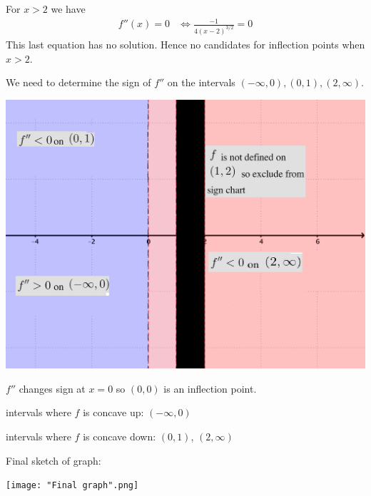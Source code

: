 \documentclass[nooutcomes]{ximera}
\begin{document}
\begin{problem}
\begin{enumerate}
\begin{freeResponse}
        For $x > 2$ we have
        \begin{align*}
          f''(x) = 0 &\iff \frac{-1}{4(x-2)^{3/2}} = 0
        \end{align*}
        This last equation has no solution.
        Hence no candidates for inflection points when $x >2$.

        We need to determine the sign of $f''$ on the intervals $(-\infty,0), (0,1), (2,\infty)$.
        \begin{image}
          \includegraphics[scale = 0.3]{figure11.png}
        \end{image}
        
        

       $f''$ changes sign at $x=0$ so $(0,0)$ is an inflection point.

        intervals where $f$ is concave up: $(-\infty, 0)$

        intervals where $f$ is concave down: $(0,1)$, $(2, \infty)$

        Final sketch of graph:
        \begin{image}
          \texttt{[image: "Final graph".png]}
        \end{image}
      \end{freeResponse}
        
        
    \end{enumerate}
\end{problem}
\end{document}
